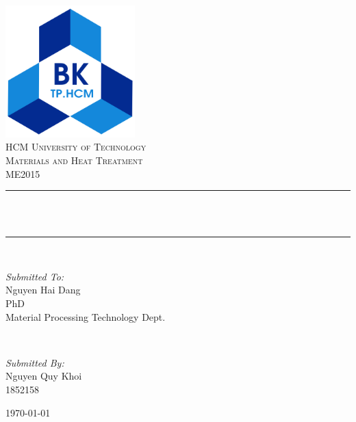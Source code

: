\documentclass{presets}
\begin{document}
	\begin{titlepage}
		\centering
		\includegraphics[width=5cm]{logo.png}\\[1.0 cm]	%
		\textsc{\LARGE HCM University of Technology}\\[1cm] %
		\textsc{\Large Materials and Heat Treatment}\\[0.5cm] %
		\textsc{\Large ME2015}\\[0.5 cm]				%
		\rule{\linewidth}{0.2 mm} \\[0.4 cm]
		{ \huge \bfseries \thetitle}\\
		\rule{\linewidth}{0.2 mm}\\[1.5cm]
		
		\begin{minipage}[t]{0.4\textwidth}
			\begin{flushleft} \large
				\emph{Submitted To:}\\
				Nguyen Hai Dang\\
				PhD\\
				Material Processing Technology Dept.\\
			\end{flushleft}
		\end{minipage}~
		\begin{minipage}[t]{0.4\textwidth}
			
			\begin{flushright} \large
				\emph{Submitted By:} \\
				Nguyen Quy Khoi\\
				1852158
			\end{flushright}
			
		\end{minipage}
		\mbox{}\vfill
		{\large \today}
	\end{titlepage}
	\tableofcontents
	\listoftables
	\listoffigures
	
	
	
\end{document}
